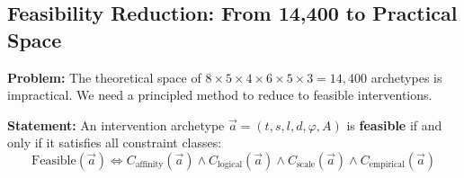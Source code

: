 \subsection{Feasibility Reduction: From 14,400 to Practical Space}
\label{sec:hhh-reduction}

\begin{tcolorbox}[colback=blue!5!white, colframe=blue!75!black,
    title=\textbf{Theorem HHH-T8: Feasibility Constraint System}]

\textbf{Problem:} The theoretical space of $8 \times 5 \times 4 \times 6 \times 5 \times 3 = 14{,}400$ archetypes is impractical. We need a principled method to reduce to feasible interventions.

\textbf{Statement:} An intervention archetype $\vec{a} = (t, s, l, d, \varphi, A)$ is \textbf{feasible} if and only if it satisfies all constraint classes:
\begin{equation}
\boxed{\text{Feasible}(\vec{a}) \iff C_{\text{affinity}}(\vec{a}) \wedge C_{\text{logical}}(\vec{a}) \wedge C_{\text{scale}}(\vec{a}) \wedge C_{\text{empirical}}(\vec{a})}
\label{eq:hhh-feasibility}
\end{equation}

\end{tcolorbox}

